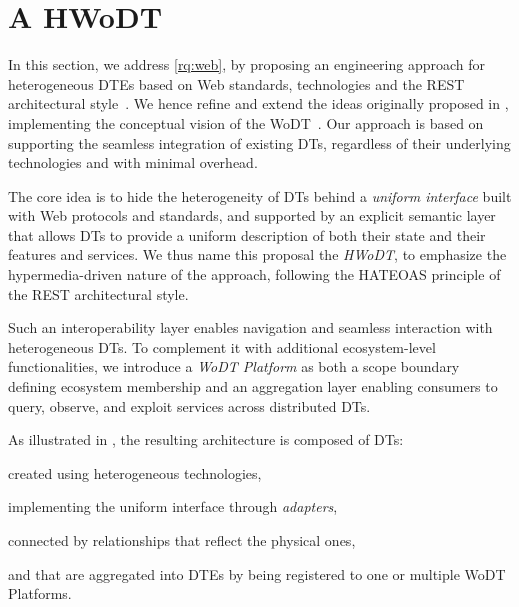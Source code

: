 \section{A \acl{HWoDT}}
\label{sec:hwodt-idea}

In this section, we address \ref{rq:web}, by proposing an engineering approach for heterogeneous \acp{DTE} based on Web standards, technologies and the \ac{REST} architectural style~\cite{fielding2002rest}.
%
We hence refine and extend the ideas originally proposed in \cite{giulianelli2024models}, implementing the conceptual vision of the \acf{WoDT}~\cite{ricci2022wodt}.
%
Our approach is based on supporting the seamless integration of existing \acp{DT}, regardless of their underlying technologies and with minimal overhead.

The core idea is to hide the heterogeneity of \acp{DT} behind a \emph{uniform interface} built with Web protocols and standards, and supported by an explicit semantic layer that allows \acp{DT} to provide a uniform description of both their state and their features and services. 
%
We thus name this proposal the \emph{\acf{HWoDT}}, to emphasize the hypermedia-driven nature of the approach, following the \ac{HATEOAS} principle of the \ac{REST} architectural style.

Such an interoperability layer enables navigation and seamless interaction with heterogeneous \acp{DT}.
%
To complement it with additional ecosystem-level functionalities, we introduce a \emph{WoDT Platform} as both a scope boundary defining ecosystem membership and an aggregation layer enabling consumers to query, observe, and exploit services across distributed \acp{DT}.

As illustrated in , the resulting architecture is composed of \acp{DT}: \begin{inlinelist}
    \item created using heterogeneous technologies,
    \item implementing the uniform interface through \emph{adapters},
    \item connected by relationships that reflect the physical ones,
    \item and that are aggregated into \acp{DTE} by being registered to one or multiple WoDT Platforms.
\end{inlinelist}    

